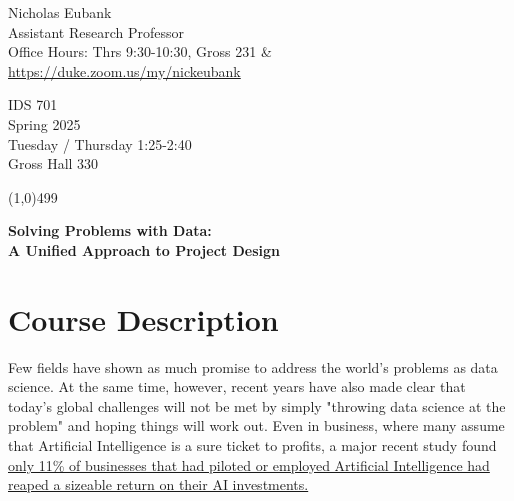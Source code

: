 \documentclass[12pt]{article}
\begin{document}
\singlespacing






\thispagestyle{empty}
\begin{minipage}[t]{.5\textwidth}
	Nicholas Eubank \\
	 Assistant Research Professor\\
	 Office Hours: Thrs 9:30-10:30, Gross 231 \& \\
	 \url{https://duke.zoom.us/my/nickeubank}
     \vspace*{0.1cm}
\end{minipage}
\begin{minipage}[t]{.5\textwidth}
	\begin{flushright}  IDS 701 \\
	Spring 2025 \\
	Tuesday / Thursday 1:25-2:40 \\
	Gross Hall 330
\end{flushright}
\end{minipage}


\line(1,0){499}

\vspace{.35in}

\begin{center}
	\textbf{\LARGE{Solving Problems with Data: \\ A Unified Approach to Project Design} }
\end{center}



\section{Course Description}

Few fields have shown as much promise to address the world's problems as data science. At the same time, however, recent years have also made clear that today's global challenges will not be met by simply "throwing data science at the problem" and hoping things will work out. Even in business, where many assume that Artificial Intelligence is a sure ticket to profits, a major recent study found \href{https://www.wired.com/story/companies-rushing-use-ai-few-see-payoff/}{only 11\% of businesses that had piloted or employed Artificial Intelligence had reaped a sizeable return on their AI investments.}
\end{document}
